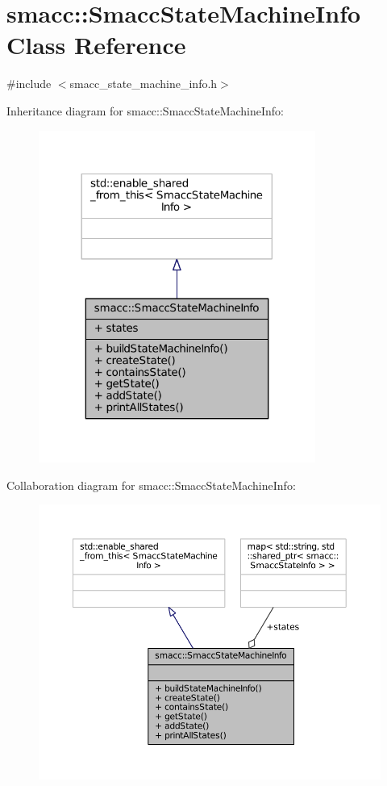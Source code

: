 \hypertarget{classsmacc_1_1SmaccStateMachineInfo}{}\section{smacc\+:\+:Smacc\+State\+Machine\+Info Class Reference}
\label{classsmacc_1_1SmaccStateMachineInfo}


{\ttfamily \#include $<$smacc\+\_\+state\+\_\+machine\+\_\+info.\+h$>$}



Inheritance diagram for smacc\+:\+:Smacc\+State\+Machine\+Info\+:
\nopagebreak
\begin{figure}[H]
\begin{center}
\leavevmode
\includegraphics[width=257pt]{classsmacc_1_1SmaccStateMachineInfo__inherit__graph}
\end{center}
\end{figure}


Collaboration diagram for smacc\+:\+:Smacc\+State\+Machine\+Info\+:
\nopagebreak
\begin{figure}[H]
\begin{center}
\leavevmode
\includegraphics[width=350pt]{classsmacc_1_1SmaccStateMachineInfo__coll__graph}
\end{center}
\end{figure}
